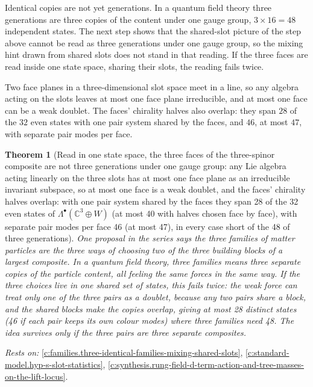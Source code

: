 \documentclass[11pt]{article}
\newtheorem{theorem}{Theorem}[section]
\theoremstyle{definition}
\theoremstyle{plain}
\providecommand{\C}{}\renewcommand{\C}{\mathbb{C}}
\begin{document}
Identical copies are not yet generations. In a quantum field theory three generations are three copies of the content under one gauge group, $3 \times 16 = 48$ independent states. The next step shows that the shared-slot picture of the step above cannot be read as three generations under one gauge group, so the mixing hint drawn from shared slots does not stand in that reading. If the three faces are read inside one state space, sharing their slots, the reading fails twice.

Two face planes in a three-dimensional slot space meet in a line, so any algebra acting on the slots leaves at most one face plane irreducible, and at most one face can be a weak doublet. The faces' chirality halves also overlap: they span $28$ of the $32$ even states with one pair system shared by the faces, and $46$, at most $47$, with separate pair modes per face.

\begin{theorem}[Read in one state space, the three faces of the three-spinor composite are not three generations under one gauge group: any Lie algebra acting linearly on the three slots has at most one face plane as an irreducible invariant subspace, so at most one face is a weak doublet, and the faces' chirality halves overlap: with one pair system shared by the faces they span 28 of the 32 even states of $\Lambda^{\bullet}(\C^{3} \oplus W)$ (at most 40 with halves chosen face by face), with separate pair modes per face 46 (at most 47), in every case short of the 48 of three generations]\label{c:synthesis.faces-of-one-slot-space-are-not-three-generations-under-one-gauge-group}
One proposal in the series says the three families of matter particles are the three ways of choosing two of the three building blocks of a largest composite. In a quantum field theory, three families means three separate copies of the particle content, all feeling the same forces in the same way. If the three choices live in one shared set of states, this fails twice: the weak force can treat only one of the three pairs as a doublet, because any two pairs share a block, and the shared blocks make the copies overlap, giving at most 28 distinct states (46 if each pair keeps its own colour modes) where three families need 48. The idea survives only if the three pairs are three separate composites.
\end{theorem}
\noindent\emph{Rests on:} \ref{c:families.three-identical-families-mixing-shared-slots}, \ref{c:standard-model.hyp-s-slot-statistics}, \ref{c:synthesis.rung-field-d-term-action-and-tree-masses-on-the-lift-locus}.
\end{document}
